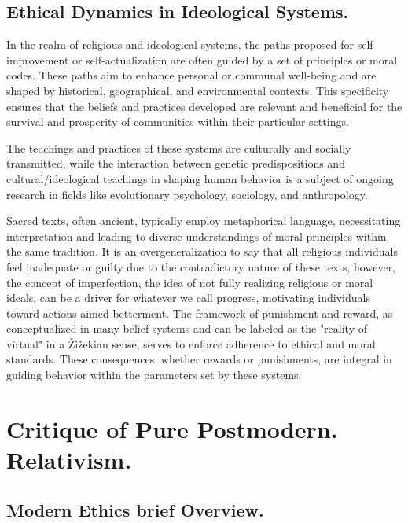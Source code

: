 \documentclass[11pt,a4]{article}
\begin{document}
    \subsection{Ethical Dynamics in Ideological Systems.} \label{religion}
        In the realm of religious and ideological systems, the paths proposed for self-improvement or
        self-actualization are often guided by a set of principles or moral codes. These paths aim to
        enhance personal or communal well-being and are shaped by historical, geographical,
        and environmental contexts. This specificity ensures that the beliefs and practices developed
        are relevant and beneficial for the survival and prosperity of communities within their
         particular settings.
        \par
        The teachings and practices of these systems are culturally and socially transmitted, while
        the interaction between genetic predispositions and cultural/ideological teachings in shaping
        human behavior is a subject of ongoing research in fields like evolutionary psychology,
        sociology, and anthropology.
        \par
        Sacred texts, often ancient, typically employ metaphorical language, necessitating
        interpretation and leading to diverse understandings of moral principles within the same tradition.
        It is an overgeneralization to say that all religious individuals feel inadequate or guilty
        due to the contradictory nature of these texts, however, the concept of imperfection,
        the idea of not fully realizing religious or moral ideals, can be a driver for whatever we call progress,
        motivating individuals toward actions aimed betterment.
        The framework of punishment and reward, as conceptualized in many belief systems and can be
        labeled as the "reality of virtual" in a Žižekian sense, serves to enforce adherence to
        ethical and moral standards. These consequences, whether rewards or punishments,
         are integral in guiding behavior within the parameters set by these systems.








\newpage
\section{Critique of Pure Postmodern. Relativism.}


\subsection{Modern Ethics brief Overview.}
\end{document}
